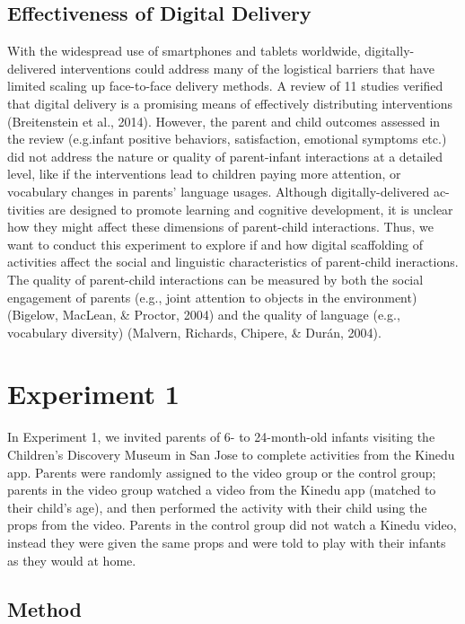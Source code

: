 \documentclass[10pt, letterpaper]{article}
\begin{document}
\subsection{Effectiveness of Digital
Delivery}\label{effectiveness-of-digital-delivery}

With the widespread use of smartphones and tablets worldwide,
digitally-delivered interventions could address many of the logistical
barriers that have limited scaling up face-to-face delivery methods. A
review of 11 studies verified that digital delivery is a promising means
of effectively distributing interventions (Breitenstein et al., 2014).
However, the parent and child outcomes assessed in the review
(e.g.infant positive behaviors, satisfaction, emotional symptoms etc.)
did not address the nature or quality of parent-infant interactions at a
detailed level, like if the interventions lead to children paying more
attention, or vocabulary changes in parents' language usages. Although
digitally-delivered ac-tivities are designed to promote learning and
cognitive development, it is unclear how they might affect these
dimensions of parent-child interactions. Thus, we want to conduct this
experiment to explore if and how digital scaffolding of activities
affect the social and linguistic characteristics of parent-child
ineractions. The quality of parent-child interactions can be measured by
both the social engagement of parents (e.g., joint attention to objects
in the environment)(Bigelow, MacLean, \& Proctor, 2004) and the quality
of language (e.g., vocabulary diversity) (Malvern, Richards, Chipere, \&
Durán, 2004).

\section{Experiment 1}\label{experiment-1}

In Experiment 1, we invited parents of 6- to 24-month-old infants
visiting the Children's Discovery Museum in San Jose to complete
activities from the Kinedu app. Parents were randomly assigned to the
video group or the control group; parents in the video group watched a
video from the Kinedu app (matched to their child's age), and then
performed the activity with their child using the props from the video.
Parents in the control group did not watch a Kinedu video, instead they
were given the same props and were told to play with their infants as
they would at home.

\subsection{Method}\label{method}
\end{document}
